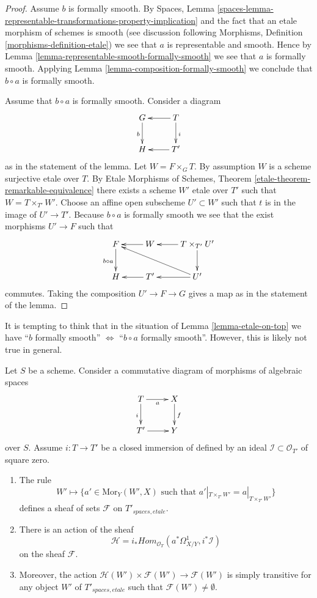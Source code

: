 \begin{proof}
Assume $b$ is formally smooth. By
Spaces,
Lemma \ref{spaces-lemma-representable-transformations-property-implication}
and the fact that an etale morphism of schemes is smooth (see discussion
following
Morphisms, Definition \ref{morphisms-definition-etale})
we see that $a$ is representable and smooth. Hence by
Lemma \ref{lemma-representable-smooth-formally-smooth}
we see that $a$ is formally smooth. Applying
Lemma \ref{lemma-composition-formally-smooth}
we conclude that $b \circ a$ is formally smooth.

\medskip\noindent
Assume that $b \circ a$ is formally smooth. Consider a diagram
$$
\xymatrix{
G \ar[d]_b & T \ar[d]^i \ar[l] \\
H & T' \ar[l]
}
$$
as in the statement of the lemma. Let $W = F \times_G T$.
By assumption $W$ is a scheme surjective etale over $T$. By
Etale Morphisms of Schemes, Theorem \ref{etale-theorem-remarkable-equivalence}
there exists a scheme $W'$ etale over $T'$ such that $W = T \times_{T'} W'$.
Choose an affine open subscheme $U' \subset W'$ such that $t$ is in
the image of $U' \to T'$. Because $b \circ a$ is formally
smooth we see that the exist morphisms $U' \to F$ such that
$$
\xymatrix{
F \ar[d]_{b \circ a} & W \ar[l] & T \times_{T'} U' \ar[d] \ar[l]\\
H & T' \ar[l] & U' \ar[llu] \ar[l]
}
$$
commutes. Taking the composition $U' \to F \to G$ gives a
map as in the statement of the lemma.
\end{proof}

\begin{remark}
\label{remark-tempting}
It is tempting to think that in the situation of
Lemma \ref{lemma-etale-on-top}
we have
``$b$ formally smooth'' $\Leftrightarrow$ ``$b \circ a$ formally smooth''.
However, this is likely not true in general.
\end{remark}

\begin{lemma}
\label{lemma-action-by-derivations}
Let $S$ be a scheme. Consider a commutative diagram of morphisms of
algebraic spaces
$$
\xymatrix{
T \ar[r]_a \ar[d]_i & X \ar[d]^f \\
T' \ar[r] & Y
}
$$
over $S$. Assume $i : T \to T'$ be a closed immersion of defined by an
ideal $\mathcal{I} \subset \mathcal{O}_{T'}$ of square zero.
\begin{enumerate}
\item The rule
$$
W' \mapsto
\{a' \in \text{Mor}_Y(W', X) \text{ such that }
a'|_{T \times_{T'} W'} = a|_{T \times_{T'} W'}\}
$$
defines a sheaf of sets $\mathcal{F}$ on $T'_{spaces, etale}$.
\item There is an action of the sheaf
$$
\mathcal{H}
=
i_*\textit{Hom}_{\mathcal{O}_T}(a^*\Omega^1_{X/Y}, i^*\mathcal{I})
$$
on the sheaf $\mathcal{F}$.
\item Moreover, the action
$\mathcal{H}(W') \times \mathcal{F}(W') \to \mathcal{F}(W')$
is simply transitive for any object $W'$ of $T'_{spaces, etale}$
such that $\mathcal{F}(W') \not = \emptyset$.
\end{enumerate}
\end{lemma}

